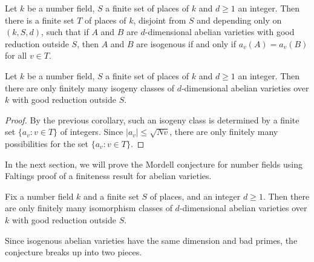 \begin{corollary}
Let $k$ be a number field, $S$ a finite set of places of $k$ and 
$d\geqslant 1$ an integer. Then there is a finite set $T$ of places of $k$, 
disjoint from $S$ and depending only on $(k,S,d)$, such that if $A$ and $B$ 
are $d$-dimensional abelian varieties with good reduction outside $S$, then 
$A$ and $B$ are isogenous if and only if $a_v(A)=a_v(B)$ for all $v\in T$. 
\end{corollary}

\begin{corollary}
Let $k$ be a number field, $S$ a finite set of places of $k$ and 
$d\geqslant 1$ an integer. Then there are only finitely many isogeny classes of 
$d$-dimensional abelian varieties over $k$ with good reduction outside $S$. 
\end{corollary}
\begin{proof}
By the previous corollary, such an isogeny class is determined by a finite set 
$\{a_v:v\in T\}$ of integers. Since $|a_v|\leqslant \sqrt{N v}$, there are only 
finitely many possibilities for the set $\{a_v:v\in T\}$. 
\end{proof}

In the next section, we will prove the Mordell conjecture for number fields 
using Faltings proof of a finiteness result for abelian varieties. 

\begin{conjecture}
Fix a number field $k$ and a finite set $S$ of places, and an integer 
$d\geqslant 1$. Then there are only finitely many isomorphism classes of 
$d$-dimensional abelian varieties over $k$ with good reduction outside $S$. 
\end{conjecture}

Since isogenous abelian varieties have the same dimension and bad primes, 
the conjecture breaks up into two pieces. 

